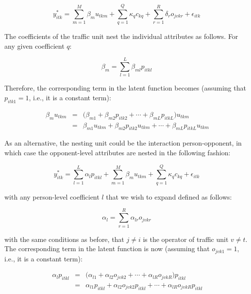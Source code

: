 \documentclass[]{elsarticle} %
\begin{document}
\begin{equation}
\label{eq:latent-function-with-hierarchical-traffic-unit}
y_{itk}^*=\sum_{m=1}^M\beta_mu_{tkm} + \sum_{q=1}^Q\kappa_qc_{kq} + \sum_{r=1}^R\delta_ro_{jvkr} + \epsilon_{itk}
\end{equation}

The coefficients of the traffic unit nest the individual attributes as
follows. For any given coefficient \(q\):

\begin{equation}
\label{eq:hierarchical-traffic-unit-coefficients}
\beta_{m}=\sum_{l=1}^L\beta_{ml}p_{itkl} 
\end{equation}

Therefore, the corresponding term in the latent function becomes
(assuming that \(p_{itk1} = 1\), i.e., it is a constant term):

\begin{equation}
\label{eq:hierarchical-traffic-unit-coefficients}
\begin{array}{rcl}\
\beta_{m}u_{tkm} &=& \big( \beta_{m1} + \beta_{m2}p_{itk2} + \cdots + \beta_{mL}p_{itkL}\big)u_{tkm}\\ 
&=& \beta_{m1}u_{tkm} + \beta_{m2}p_{itk2}u_{tkm} + \cdots + \beta_{mL}p_{itkL}u_{tkm}
\end{array}
\end{equation}

As an alternative, the nesting unit could be the interaction
person-opponent, in which case the opponent-level attributes are nested
in the following fashion:

\begin{equation}
\label{eq:latent-function-with-opponent-variables}
y_{itk}^*=\sum_{l=1}^L\alpha_lp_{itkl} + \sum_{m=1}^M\beta_mu_{tkm} + \sum_{q=1}^Q\kappa_qc_{kq} + \epsilon_{itk}
\end{equation}

\noindent with any person-level coefficient \(l\) that we wish to expand
defined as follows:

\begin{equation}
\label{eq:hierarchical-traffic-unit-coefficients}
\alpha_{l}=\sum_{r=1}^R\alpha_{lr}o_{jvkr}
\end{equation}

\noindent with the same conditions as before, that \(j\ne i\) is the
operator of traffic unit \(v\ne t\). The corresponding term in the
latent function is now (assuming that \(o_{jvk1}=1\), i.e., it is a
constant term):

\begin{equation}
\label{eq:hierarchical-traffic-unit-coefficients}
\begin{array}{rcl}\
\alpha_{l}p_{itkl} &=& \big(\alpha_{l1} + \alpha_{l2}o_{jvk2} + \cdots + \alpha_{lR}o_{jvkR} \big)p_{itkl}\\
&=& \alpha_{l1}p_{itkl} + \alpha_{l2}o_{jvk2}p_{itkl} + \cdots + \alpha_{lR}o_{jvkR}p_{itkl}
\end{array} 
\end{equation}
\end{document}
